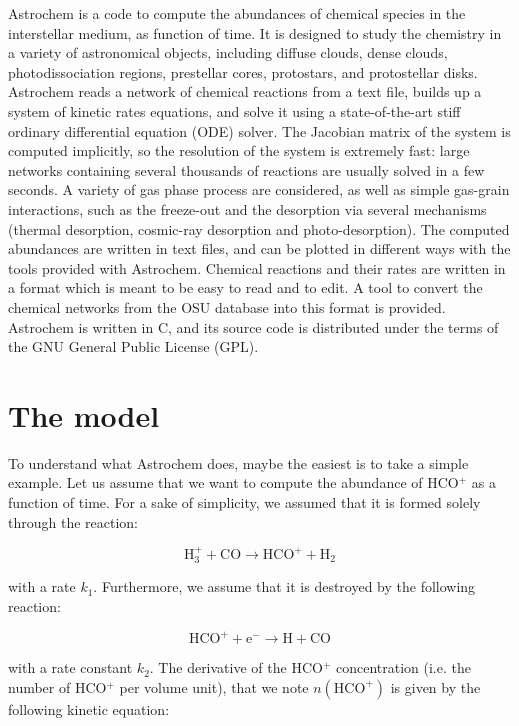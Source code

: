 \documentclass[a4paper,12pt]{article}
\newcommand{\conc}[1]{n(\mathrm{#1})}
\begin{document}
{Astrochem is a code to compute the abundances of chemical species in
the interstellar medium, as function of time. It is designed to study
the chemistry in a variety of astronomical objects, including diffuse
clouds, dense clouds, photodissociation regions, prestellar cores,
protostars, and protostellar disks. Astrochem reads a network of
chemical reactions from a text file, builds up a system of kinetic
rates equations, and solve it using a state-of-the-art stiff ordinary
differential equation (ODE) solver. The Jacobian matrix of the system
is computed implicitly, so the resolution of the system is extremely
fast: large networks containing several thousands of reactions are
usually solved in a few seconds. A variety of gas phase process are
considered, as well as simple gas-grain interactions, such as the
freeze-out and the desorption via several mechanisms (thermal
desorption, cosmic-ray desorption and photo-desorption). The computed
abundances are written in text files, and can be plotted in different
ways with the tools provided with Astrochem. Chemical reactions and
their rates are written in a format which is meant to be easy to read
and to edit. A tool to convert the chemical networks from the OSU
database into this format is provided. Astrochem is written in C, and
its source code is distributed under the terms of the GNU General
Public License (GPL).

\section{The model}
\label{sec:model}

To understand what Astrochem does, maybe the easiest is to take a
simple example. Let us assume that we want to compute the
abundance of HCO$^{+}$ as a function of time. For a sake of
simplicity, we assumed that it is formed solely through the reaction:

\begin{equation}
  \mathrm{H_{3}^{+} + CO \rightarrow HCO^{+} + H_{2}}
\end{equation}

\noindent
with a rate $k_{1}$. Furthermore, we assume that it is destroyed by
the following reaction:

\begin{equation}
  \mathrm{HCO^{+} + e^{-} \rightarrow H + CO}
\end{equation}

\noindent
with a rate constant $k_{2}$. The derivative of the HCO$^{+}$
concentration (i.e. the number of HCO$^{+}$ per volume unit), that we
note $\conc{HCO^{+}}$ is given by the following kinetic equation:

}
\end{document}
